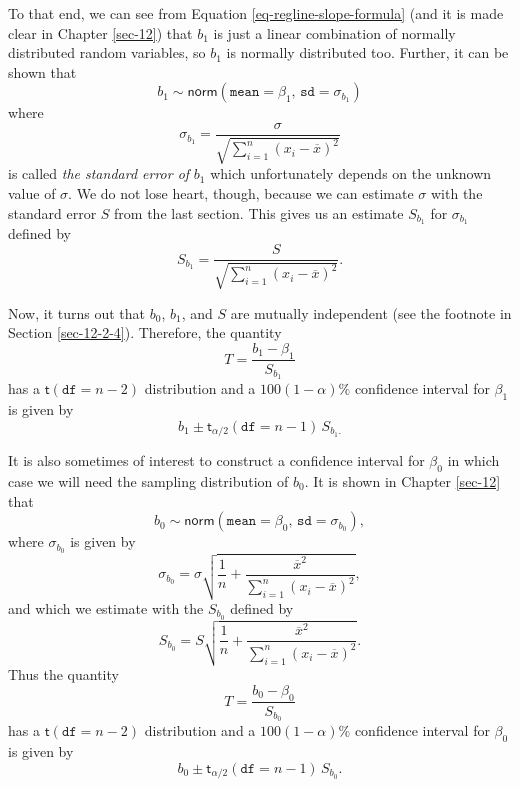 To that end, we can see from Equation \eqref{eq-regline-slope-formula} (and it
is made clear in Chapter \ref{sec-12}) that \(b_{1}\) is
just a linear combination of normally distributed random variables, so
\(b_{1}\) is normally distributed too. Further, it can be shown that
\begin{equation}
b_{1}\sim\mathsf{norm}\left(\mathtt{mean}=\beta_{1},\,\mathtt{sd}=\sigma_{b_{1}}\right)
\end{equation}
where
\begin{equation}
\sigma_{b_{1}}=\frac{\sigma}{\sqrt{\sum_{i=1}^{n}(x_{i}-\overline{x})^{2}}}
\end{equation}
is called \emph{the standard error of} \(b_{1}\) which unfortunately
depends on the unknown value of \(\sigma\). We do not lose heart,
though, because we can estimate \(\sigma\) with the standard error
\(S\) from the last section. This gives us an estimate \(S_{b_{1}}\)
for \(\sigma_{b_{1}}\) defined by
\begin{equation}
S_{b_{1}}=\frac{S}{\sqrt{\sum_{i=1}^{n}(x_{i}-\overline{x})^{2}}}.
\end{equation}

Now, it turns out that \(b_{0}\), \(b_{1}\), and \(S\) are mutually
independent (see the footnote in Section \ref{sec-12-2-4}). Therefore, the quantity
\begin{equation}
T=\frac{b_{1}-\beta_{1}}{S_{b_{1}}}
\end{equation}
has a \(\mathsf{t}(\mathtt{df}=n-2)\) distribution and a \(100(1 -
\alpha)\% \) confidence interval for \(\beta_{1}\) is given by
\begin{equation}
b_{1}\pm\mathsf{t}_{\alpha/2}(\mathtt{df}=n-1)\, S_{b_{1}.}
\end{equation}

It is also sometimes of interest to construct a confidence interval
for \(\beta_{0}\) in which case we will need the sampling distribution
of \(b_{0}\). It is shown in Chapter \ref{sec-12} that
\begin{equation}
b_{0}\sim\mathsf{norm}\left(\mathtt{mean}=\beta_{0},\,\mathtt{sd}=\sigma_{b_{0}}\right),
\end{equation}
where \(\sigma_{b_{0}}\) is given by
\begin{equation}
\sigma_{b_{0}}=\sigma\sqrt{\frac{1}{n}+\frac{\overline{x}^{2}}{\sum_{i=1}^{n}(x_{i}-\overline{x})^{2}}},
\end{equation}
and which we estimate with the \(S_{b_{0}}\) defined by
\begin{equation}
S_{b_{0}}=S\sqrt{\frac{1}{n}+\frac{\overline{x}^{2}}{\sum_{i=1}^{n}(x_{i}-\overline{x})^{2}}}.
\end{equation}
Thus the quantity
\begin{equation}
T=\frac{b_{0}-\beta_{0}}{S_{b_{0}}}
\end{equation}
has a \(\mathsf{t}(\mathtt{df}=n-2)\) distribution and a
\(100(1-\alpha)\%\) confidence interval for \(\beta_{0}\) is given by
\begin{equation}
b_{0}\pm\mathsf{t}_{\alpha/2}(\mathtt{df}=n-1)\, S_{b_{0}}.
\end{equation}

